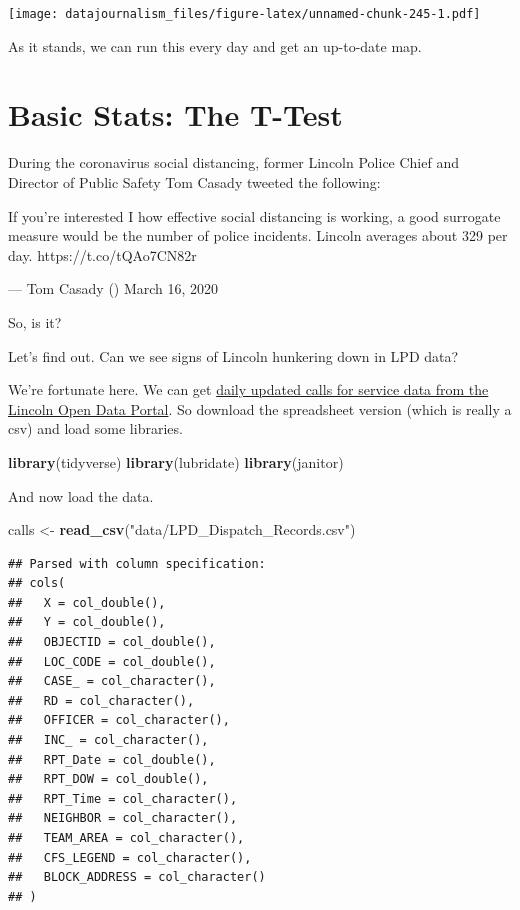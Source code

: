 \documentclass[]{book}
\newenvironment{Shaded}{\begin{snugshade}}{\end{snugshade}}
\newcommand{\KeywordTok}[1]{\textcolor[rgb]{0.13,0.29,0.53}{\textbf{#1}}}
\newcommand{\NormalTok}[1]{#1}
\newcommand{\StringTok}[1]{\textcolor[rgb]{0.31,0.60,0.02}{#1}}
\begin{document}
\texttt{[image: datajournalism\_files/figure-latex/unnamed-chunk-245-1.pdf]}

As it stands, we can run this every day and get an up-to-date map.

\hypertarget{basic-stats-the-t-test}{%
\chapter{Basic Stats: The T-Test}\label{basic-stats-the-t-test}}

During the coronavirus social distancing, former Lincoln Police Chief and Director of Public Safety Tom Casady tweeted the following:

If you're interested I how effective social distancing is working, a good surrogate measure would be the number of police incidents. Lincoln averages about 329 per day. https://t.co/tQAo7CN82r

--- Tom Casady (\citet{TCasady304}) March 16, 2020

So, is it?

Let's find out. Can we see signs of Lincoln hunkering down in LPD data?

We're fortunate here. We can get \href{http://opendata.lincoln.ne.gov/datasets/lpd-dispatch-records}{daily updated calls for service data from the Lincoln Open Data Portal}. So download the spreadsheet version (which is really a csv) and load some libraries.

\begin{Shaded}
\begin{Highlighting}[]
\KeywordTok{library}\NormalTok{(tidyverse)}
\KeywordTok{library}\NormalTok{(lubridate)}
\KeywordTok{library}\NormalTok{(janitor)}
\end{Highlighting}
\end{Shaded}

And now load the data.

\begin{Shaded}
\begin{Highlighting}[]
\NormalTok{calls <-}\StringTok{ }\KeywordTok{read_csv}\NormalTok{(}\StringTok{"data/LPD_Dispatch_Records.csv"}\NormalTok{)}
\end{Highlighting}
\end{Shaded}

\begin{verbatim}
## Parsed with column specification:
## cols(
##   X = col_double(),
##   Y = col_double(),
##   OBJECTID = col_double(),
##   LOC_CODE = col_double(),
##   CASE_ = col_character(),
##   RD = col_character(),
##   OFFICER = col_character(),
##   INC_ = col_character(),
##   RPT_Date = col_double(),
##   RPT_DOW = col_double(),
##   RPT_Time = col_character(),
##   NEIGHBOR = col_character(),
##   TEAM_AREA = col_character(),
##   CFS_LEGEND = col_character(),
##   BLOCK_ADDRESS = col_character()
## )
\end{verbatim}
\end{document}
